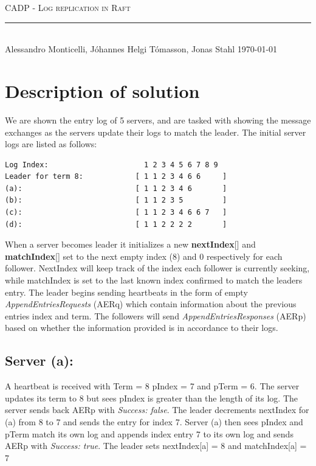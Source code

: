 \documentclass[a4paper,11pt]{article}
\newcommand{\linia}{\rule{\linewidth}{0.5pt}}
\begin{document}
\begin{center}
\vspace{2ex}
{\huge \textsc{CADP - Log replication in Raft}}
\vspace{1ex}
\\
\linia\\
Alessandro Monticelli, Jóhannes Helgi Tómasson, Jonas Stahl \hfill \today %
\vspace{4ex}
\end{center}

\section*{Description of solution}
We are shown the entry log of 5 servers, and are tasked with showing the message exchanges as the servers update their logs to match the leader. The initial server logs are listed as follows:

\begin{verbatim}
Log Index:                      1 2 3 4 5 6 7 8 9
Leader for term 8:            [ 1 1 2 3 4 6 6     ]
(a):                          [ 1 1 2 3 4 6       ]
(b):                          [ 1 1 2 3 5         ]
(c):                          [ 1 1 2 3 4 6 6 7   ]
(d):                          [ 1 1 2 2 2 2       ]
\end{verbatim}

When a server becomes leader it initializes a new \textbf{nextIndex}[] and \textbf{matchIndex}[] set to the next empty index (8) and 0 respectively for each follower. NextIndex will keep track of the index each follower is currently seeking, while matchIndex is set to the last known index confirmed to match the leaders entry. 
The leader begins sending heartbeats in the form of empty \textit{AppendEntriesRequests} (AERq) which contain information about the previous entries index and term. The followers will send \textit{AppendEntriesResponses} (AERp) based on whether the information provided is in accordance to their logs.

\subsection*{Server (a):}
A heartbeat is received with Term = 8 pIndex = 7 and pTerm = 6.
The server updates its term to 8 but sees pIndex is greater than the length of its log.
The server sends back AERp with \textit{Success: false}. The leader decrements nextIndex for (a) from 8 to 7 and sends the entry for index 7. Server (a) then sees pIndex and pTerm match its own log and appends index entry 7 to its own log and sends AERp with \textit{Success: true}. The leader sets nextIndex[a] = 8 and matchIndex[a] = 7
\end{document}
